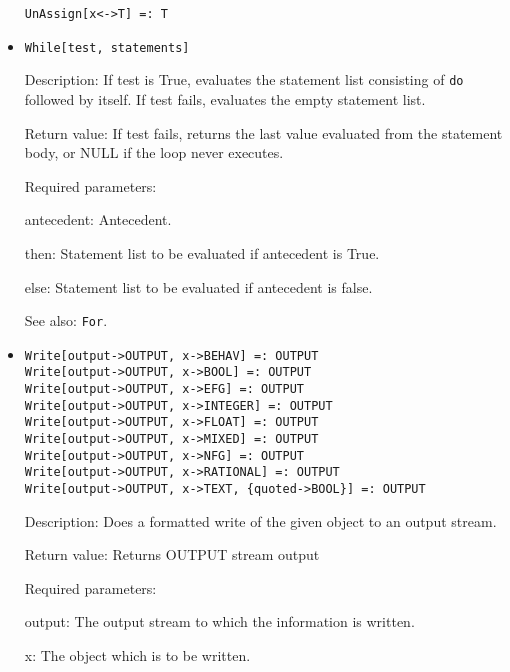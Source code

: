 \begin{itemize}

\protect \large \begin{verbatim}
UnAssign[x<->T] =: T
\end{verbatim}\normalsize




\item 
\protect \large \begin{verbatim}
While[test, statements]
\end{verbatim} \normalsize
  
\bd
\item
[Description:] If test is True, evaluates the statement list consisting of
\verb+do+ followed by itself.  If test fails, evaluates the empty
statement list.
\item
[Return value:] If test fails, returns the last value evaluated from the
statement body, or NULL if the loop never executes.

\item
[Required parameters:]\hfil\null
\bd
\item
[antecedent:] Antecedent.  
\item
[then:] Statement list to be evaluated if antecedent is True. 
\item
[else:] Statement list to be evaluated if antecedent is false. 
\ed
\item
[See also:] \verb+For+.
\ed

\item
\protect \large \begin{verbatim}
Write[output->OUTPUT, x->BEHAV] =: OUTPUT 
Write[output->OUTPUT, x->BOOL] =: OUTPUT 
Write[output->OUTPUT, x->EFG] =: OUTPUT
Write[output->OUTPUT, x->INTEGER] =: OUTPUT
Write[output->OUTPUT, x->FLOAT] =: OUTPUT
Write[output->OUTPUT, x->MIXED] =: OUTPUT
Write[output->OUTPUT, x->NFG] =: OUTPUT
Write[output->OUTPUT, x->RATIONAL] =: OUTPUT
Write[output->OUTPUT, x->TEXT, {quoted->BOOL}] =: OUTPUT
\end{verbatim}\normalsize

\bd
\item
[Description:] Does a formatted write of the given object to an output
stream. 
\item
[Return value:] Returns OUTPUT stream output
\item
[Required parameters:]\hfil\null

\bd
\item
[output:] The output stream to which the information is written.  
\item
[x:] The object which is to be written.  
\ed
\ed




\end{itemize}










 




















